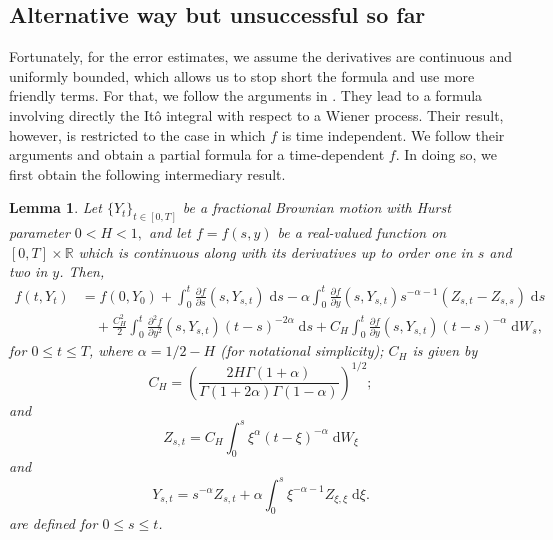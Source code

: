 \documentclass[reqno,12pt]{amsart}
\theoremstyle{plain}%
\newtheorem{lem}{Lemma}[section]
\theoremstyle{definition}
\begin{document}
\subsection{Alternative way but unsuccessful so far}

Fortunately, for the error estimates, we assume the derivatives are continuous and uniformly bounded, which allows us to stop short the formula and use more friendly terms. For that, we follow the arguments in \cite[Theorem 2.7.4]{Mishura2008}. They lead to a formula involving directly the It\^o integral with respect to a Wiener process. Their result, however, is restricted to the case in which $f$ is time independent. We follow their arguments and obtain a partial formula for a time-dependent $f$. In doing so, we first obtain the following intermediary result.

\begin{lem}
    \label{lempartialItoformula}
    Let $\{Y_t\}_{t\in [0, T]}$ be a fractional Brownian motion with Hurst parameter $0 < H < 1,$ and let $f=f(s, y)$ be a real-valued function on $[0, T]\times \mathbb{R}$ which is continuous along with its derivatives up to order one in $s$ and two in $y$. Then,
    \begin{equation}
        \label{partialItoformula}
        \begin{aligned}
            f(t, Y_t) & = f(0, Y_0) + \int_{0}^t \frac{\partial f}{\partial s}(s, Y_{s, t})\;\mathrm{d}s - \alpha \int_{0}^t \frac{\partial f}{\partial y}(s, Y_{s, t})s^{-\alpha - 1} (Z_{s, t} - Z_{s, s})\;\mathrm{d}s \\
            & \quad + \frac{C_H^2}{2}\int_{0}^t \frac{\partial^2 f}{\partial y^2}(s, Y_{s, t}) (t - s)^{-2\alpha} \;\mathrm{d}s + C_H \int_{0}^t \frac{\partial f}{\partial y}(s, Y_{s, t})(t - s)^{-\alpha}\;\mathrm{d} W_s,
        \end{aligned}
    \end{equation}
    for $0 \leq t \leq T$, where $\alpha = 1/2 - H$ (for notational simplicity); $C_H$ is given by
    \begin{equation}
        \label{defCH}
        C_H = \left( \frac{2H\Gamma(1+\alpha)}{\Gamma(1 + 2\alpha)\Gamma(1-\alpha)} \right)^{1/2};
    \end{equation}
    and
    \begin{equation}
        \label{defZHst}
        Z_{s, t} = C_H \int_0^s \xi^{\alpha}(t - \xi)^{-\alpha} \;\mathrm{d}W_\xi
    \end{equation}
    and
    \begin{equation}
        \label{defYHst}
        Y_{s, t} = s^{-\alpha} Z_{s, t} + \alpha \int_0^s \xi^{-\alpha-1}Z_{\xi, \xi}\;\mathrm{d}\xi.
    \end{equation}
    are defined for $0\leq s \leq t$.
\end{lem}
\end{document}
